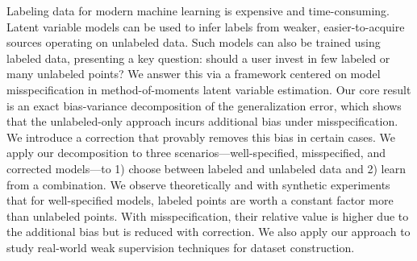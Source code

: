 Labeling data for modern machine learning is expensive and time-consuming. Latent variable models can be used to infer labels from weaker, easier-to-acquire sources operating on unlabeled data.
Such models can also be trained using labeled data, presenting a key question: should a user invest in few labeled or many unlabeled points? We answer this via a framework centered on model misspecification in method-of-moments latent variable estimation.
%
Our core result is an exact bias-variance decomposition of the generalization error, which shows that the unlabeled-only approach incurs additional bias under misspecification. We introduce a correction that provably removes this bias in certain cases.
%
We apply our decomposition to three scenarios---well-specified, misspecified, and corrected models---to 1) choose between  labeled and unlabeled data and 2) learn from a combination. We observe theoretically and with synthetic experiments that for well-specified models, labeled points are worth a constant factor more than unlabeled points. With misspecification, their relative value is higher due to the additional bias but is reduced with correction. We also apply our approach to study real-world weak supervision techniques for dataset construction.




